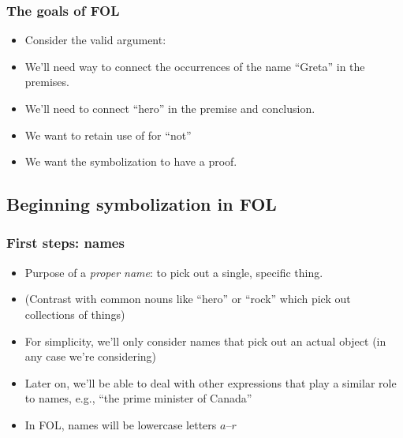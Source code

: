 \begin{frame}
  \frametitle{The goals of FOL}

  \begin{itemize}[<+->]
    \item Consider the valid argument:
    \item We'll need way to connect the occurrences of the name
    ``Greta'' in the premises.
    \item We'll need to connect ``hero'' in the premise and conclusion.
    \item We want to retain use of \enot{} for ``not''
    \item We want the symbolization to have a proof.
  \end{itemize}
\end{frame}

\subsection{Beginning symbolization in FOL}

\begin{frame}
  \frametitle{First steps: names}

  \begin{itemize}[<+->]
    \item Purpose of a \emph{proper name}: to pick out a single, specific thing.
    \item (Contrast with common nouns like ``hero'' or ``rock'' which pick out collections of things)
    \item For simplicity, we'll only consider names that pick out an
    actual object (in any case we're considering)
    \item Later on, we'll be able to deal with other expressions that play a similar role to names, e.g., ``the prime minister of Canada''
    \item In FOL, names will be lowercase letters $a$--$r$
  \end{itemize}
\end{frame}

